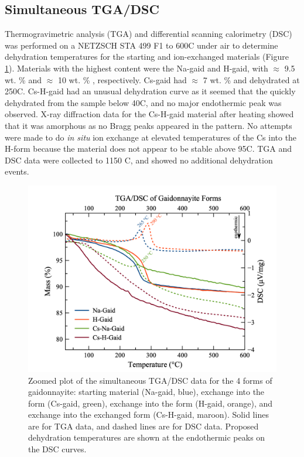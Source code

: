 \documentclass[journal=acsodf,manuscript=article]{achemso}
\begin{document}
\subsection{Simultaneous TGA/DSC}
{\label{sec_tga_dsc}}  %

Thermogravimetric analysis (TGA) and differential scanning calorimetry
(DSC) was performed on a NETZSCH STA 499 F1 to 600\degree C under
air to determine dehydration temperatures for the starting and
ion-exchanged materials (Figure {\ref{fig_tga_dsc}}). 
Materials with the highest  content were the Na-gaid
and H-gaid, with \(\approx\) 9.5 wt. \% and \(\approx\) 10 wt. \%
, respectively.  Cs-gaid had \(\approx\) 7 wt. \%
 and dehydrated at 250\degree C.  Cs-H-gaid had
an unusual dehydration curve as it seemed that the 
quickly dehydrated from the sample below 40\degree C, and no
major endothermic peak was observed.  X-ray diffraction data for the
Cs-H-gaid material after heating showed that it was amorphous as no Bragg peaks
appeared in the pattern.  No attempts were made to do \textit{in situ} ion exchange at elevated temperatures of the Cs into the H-form because the material does not appear to be stable above 95\degree C. TGA and DSC data were collected to 1150 \degree C, and showed no additional dehydration events.

 
\begin{figure}[h!]  %
\begin{center}
\includegraphics[width=0.70\columnwidth]{figures/TGA-DSC_all_data_baseline_corrected.png}
\caption{{Zoomed plot of the simultaneous TGA/DSC data for the 4 forms of gaidonnayite: starting
material (Na-gaid, blue),  exchange into the
 form (Cs-gaid, green), 
exchange into the  form (H-gaid, orange), and
 exchange into the  exchanged
form (Cs-H-gaid, maroon).  Solid lines are for TGA data, and dashed
lines are for DSC data.  Proposed dehydration temperatures are shown at
the endothermic peaks on the DSC curves.  
{\label{fig_tga_dsc}}%
}}
\end{center}
\end{figure}
\end{document}
